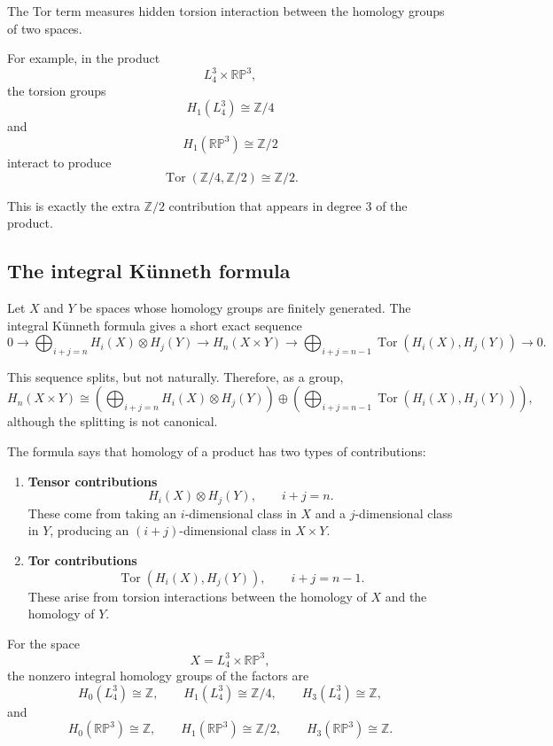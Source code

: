 \documentclass[12pt,a4paper]{article}
\theoremstyle{notespace}
\begin{document}
The Tor term measures hidden torsion interaction between the homology groups of two spaces.

For example, in the product
\[
L_4^3\times \mathbb{RP}^3,
\]
the torsion groups
\[
H_1(L_4^3)\cong \mathbb Z/4
\]
and
\[
H_1(\mathbb{RP}^3)\cong \mathbb Z/2
\]
interact to produce
\[
\operatorname{Tor}(\mathbb Z/4,\mathbb Z/2)
\cong
\mathbb Z/2.
\]

This is exactly the extra \(\mathbb Z/2\) contribution that appears in degree \(3\) of the product.

\subsection{The integral Künneth formula}

Let \(X\) and \(Y\) be spaces whose homology groups are finitely generated. The integral Künneth formula gives a short exact sequence
\[
0
\longrightarrow
\bigoplus_{i+j=n}
H_i(X)\otimes H_j(Y)
\longrightarrow
H_n(X\times Y)
\longrightarrow
\bigoplus_{i+j=n-1}
\operatorname{Tor}(H_i(X),H_j(Y))
\longrightarrow
0.
\]

This sequence splits, but not naturally. Therefore, as a group,
\[
H_n(X\times Y)
\cong
\left(
\bigoplus_{i+j=n}
H_i(X)\otimes H_j(Y)
\right)
\oplus
\left(
\bigoplus_{i+j=n-1}
\operatorname{Tor}(H_i(X),H_j(Y))
\right),
\]
although the splitting is not canonical.

The formula says that homology of a product has two types of contributions:

\begin{enumerate}
	\item \textbf{Tensor contributions}
	\[
	H_i(X)\otimes H_j(Y),
	\qquad i+j=n.
	\]
	These come from taking an \(i\)-dimensional class in \(X\) and a \(j\)-dimensional class in \(Y\), producing an \((i+j)\)-dimensional class in \(X\times Y\).
	
	\item \textbf{Tor contributions}
	\[
	\operatorname{Tor}(H_i(X),H_j(Y)),
	\qquad i+j=n-1.
	\]
	These arise from torsion interactions between the homology of \(X\) and the homology of \(Y\).
\end{enumerate}

For the space
\[
X=L_4^3\times \mathbb{RP}^3,
\]
the nonzero integral homology groups of the factors are
\[
H_0(L_4^3)\cong \mathbb Z,
\qquad
H_1(L_4^3)\cong \mathbb Z/4,
\qquad
H_3(L_4^3)\cong \mathbb Z,
\]
and
\[
H_0(\mathbb{RP}^3)\cong \mathbb Z,
\qquad
H_1(\mathbb{RP}^3)\cong \mathbb Z/2,
\qquad
H_3(\mathbb{RP}^3)\cong \mathbb Z.
\]
\end{document}
